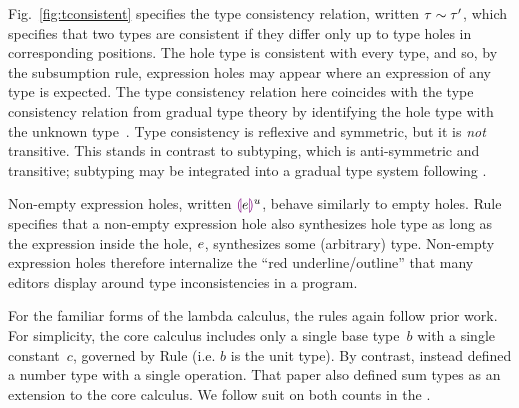

Fig.~\ref{fig:tconsistent} specifies the type consistency relation, written $\tau \sim \tau'$, which specifies that two types are consistent if they differ only up to type holes in corresponding positions.
%
The hole type is consistent with every type, and so, by the subsumption rule, expression holes may appear where an expression of any type is expected. The type consistency relation here coincides with the type consistency relation from gradual type theory by identifying the hole type with the unknown type~\cite{Siek06a}.
%
Type consistency is reflexive and symmetric, but it is \emph{not} transitive.
%
This stands in contrast to subtyping, which is anti-symmetric and transitive; subtyping may be integrated into a gradual type system following \citet{Siek:2007qy}.

Non-empty expression holes, written $\textcolor{violet}{\llparenthesis}e\textcolor{violet}{\rrparenthesis}^{u}$, behave similarly to empty holes.
%
Rule  specifies that a non-empty expression hole also synthesizes hole type as long as the expression inside the hole, $e$, synthesizes some (arbitrary) type.
%
Non-empty expression holes therefore internalize the ``red underline/outline'' that many editors display around type inconsistencies in a program.

For the familiar forms of the lambda calculus, the rules again follow prior work.
%
For simplicity, the core calculus includes only a single base type~$b$ with a single constant~$c$, governed by Rule  (i.e. $b$ is the unit type).
%
By contrast, \citet{popl-paper} instead defined a number type with a single operation. That paper also defined sum types as an extension to the core calculus. We follow suit on both counts in the \appendixName.%
%

